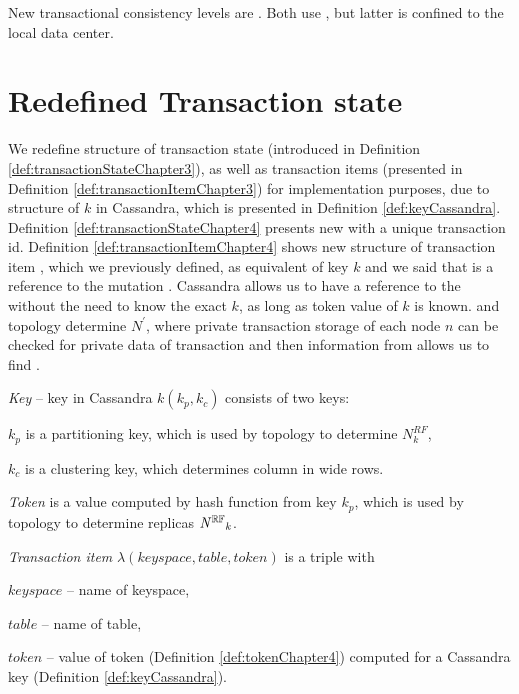 New transactional consistency levels are . Both use \mpt, but latter is confined to the local data center.

\section{Redefined Transaction state}
We redefine structure of transaction state \txState (introduced in Definition \ref{def:transactionStateChapter3}), as well as transaction items \txItems (presented in Definition \ref{def:transactionItemChapter3}) for implementation purposes, due to structure of $k$ in Cassandra, which is presented in Definition \ref{def:keyCassandra}. Definition \ref{def:transactionStateChapter4} presents new \txState with a unique transaction id. Definition \ref{def:transactionItemChapter4} shows new structure of transaction item \txItem, which we previously defined, as equivalent of key $k$ and we said that \txItem is a reference to the mutation . Cassandra allows us to have a reference to the  without the need to know the exact $k$, as long as token value of $k$ is known. \txItem and topology \topology determine $N^'$, where private transaction storage \txStorage of each node $n$ can be checked for private data of transaction \transaction and then information from \txItem allows us to find .



\begin{definition}
\label{def:keyCassandra}
\emph{Key} -- key in Cassandra $k(k_p,k_c)$ consists of two keys: 
\begin{enumerate*}[label=\alph*)]
\item $k_p$ is a partitioning key, which is used by topology \topology to determine $\mathit{N}^{RF}_k$,
\item $k_c$ is a clustering key, which determines column in wide rows.
\end{enumerate*}
\end{definition}

\begin{definition}
\label{def:tokenChapter4}
\emph{Token} is a value computed by hash function from key $k_p$, which is used by topology \topology to determine replicas $\mathit{N^{\mathbb{RF}}}_k$.
\end{definition}


\begin{definition}
\label{def:transactionItemChapter4}
\emph{Transaction item} $\lambda(\mathit{keyspace}, \mathit{table}, \mathit{token})$ is a triple with \begin{enumerate*}[label=\alph*)]
\item $\mathit{keyspace}$ -- name of keyspace,
\item $\mathit{table}$ -- name of table,
\item $\mathit{token}$ -- value of token (Definition \ref{def:tokenChapter4}) computed for a Cassandra key (Definition \ref{def:keyCassandra}).
\end{enumerate*}
\end{definition}

